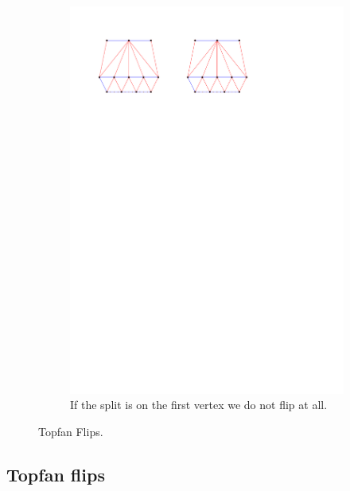 \begin{figure}[!b]
\begin{subfigure}[t]{0.45 \textwidth}
        \includegraphics[width =\textwidth]{topFanFlips/img/splitfront}
        \caption{If the split is on the first vertex we do not flip at all.}
        \label{fig:fanflip:splitFirstVertex}
    \end{subfigure}

    \caption{Topfan Flips.}
    \label{fig:fanflip:fanflips}
\end{figure}

\subsection{Topfan flips}
\thispagestyle{plain}
\label{ss:fanflip}

